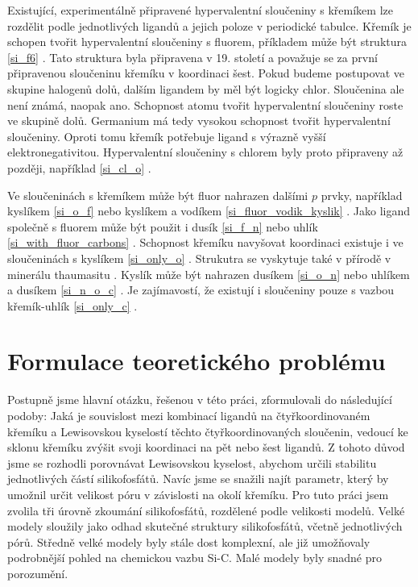 \documentclass[
  digital, %
  table,   %
  lof,     %
  lot,     %
  oneside,
]{fithesis3}
\begin{document}
Existující, experimentálně připravené hypervalentní sloučeniny s křemíkem lze rozdělit podle jednotlivých ligandů a jejich poloze v periodické tabulce. Křemík je schopen tvořit hypervalentní sloučeniny s fluorem, příkladem může být struktura   \ref{si_f6} \cite{memoriesphysiquelussac}. Tato struktura byla připravena v 19. století a považuje se za první připravenou sloučeninu křemíku v koordinaci šest. Pokud budeme postupovat ve skupine halogenů dolů, dalším ligandem by měl být logicky chlor. Sloučenina  ale není známá, naopak  ano. Schopnost atomu tvořit hypervalentní sloučeniny roste ve skupině dolů. Germanium má tedy vysokou schopnost tvořit hypervalentní sloučeniny. Oproti tomu křemík potřebuje ligand s výrazně vyšší elektronegativitou. Hypervalentní sloučeniny s chlorem byly proto připraveny až později, například \ref{si_cl_o} \cite{LAZAREV199716}.

Ve sloučeninách s křemíkem může být fluor nahrazen dalšími $p$ prvky, například kyslíkem \ref{si_o_f} \cite{C0DT01115K} nebo kyslíkem a vodíkem \ref{si_fluor_vodik_kyslik} \cite{BOYER19812165}.
Jako ligand společně s fluorem může být použit i dusík \ref{si_f_n} \cite{C0DT01115K} nebo uhlík \ref{si_with_fluor_carbons} \cite{kremikfluorcarbon}. Schopnost křemíku navyšovat koordinaci existuje i ve sloučeninách s kyslíkem \ref{si_only_o} \cite{flyn1969}. Strukutra  se vyskytuje také v přírodě v minerálu thaumasitu \cite{Edge:a08100}. Kyslík může být nahrazen dusíkem  \ref{si_o_n} \cite{Wagler2014} nebo uhlíkem a dusíkem  \ref{si_n_o_c} \cite{Wagler2014}. Je zajímavostí, že existují i sloučeniny pouze s vazbou křemík-uhlík \ref{si_only_c} \cite{A901953G} \cite{Wagler2014}.

\section{Formulace teoretického problému}
Postupně jsme hlavní otázku, řešenou v této práci, zformulovali do následující podoby: Jaká je souvislost mezi kombinací ligandů na čtyřkoordinovaném křemíku a Lewisovskou kyselostí těchto čtyřkoordinovaných sloučenin, vedoucí ke sklonu křemíku zvýšit svoji koordinaci na pět nebo šest ligandů.
Z tohoto důvod jsme se rozhodli porovnávat Lewisovskou kyselost, abychom určili stabilitu jednotlivých částí silikofosfátů. Navíc jsme se snažili najít parametr, který by umožnil určit velikost póru v závislosti na okolí křemíku. Pro tuto práci jsem zvolila tři úrovně zkoumání silikofosfátů, rozdělené podle velikosti modelů. Velké modely sloužily jako odhad skutečné struktury silikofosfátů, včetně jednotlivých pórů. Středně velké modely byly stále dost komplexní, ale již umožňovaly podrobnější pohled na chemickou vazbu Si-C. Malé modely byly snadné pro porozumění.
\end{document}
